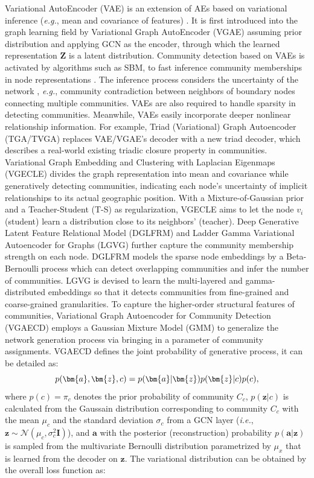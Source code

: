 \label{sec-model-vae}
Variational AutoEncoder (VAE) is an extension of AEs based on variational inference (\textit{e.g.}, mean and covariance of features) . It is first introduced into the graph learning field by Variational Graph AutoEncoder (VGAE)  assuming prior distribution and applying GCN as the encoder, through which the learned representation $\bm{Z}$ is a latent distribution. Community detection based on VAEs is activated by algorithms such as SBM, to fast inference community memberships in node representations . The inference process considers the uncertainty of the network , \textit{e.g.}, community contradiction between neighbors of boundary nodes connecting multiple communities. VAEs are also required to handle sparsity in detecting communities. Meanwhile, VAEs easily incorporate deeper nonlinear relationship information. For example, Triad (Variational) Graph Autoencoder (TGA/TVGA)  replaces VAE/VGAE's decoder with a new triad decoder, which describes a real-world existing triadic closure property in communities.
Variational Graph Embedding and Clustering with Laplacian Eigenmaps (VGECLE)  divides the graph representation into mean and covariance while generatively detecting communities, indicating each node's uncertainty of implicit relationships to its actual geographic position. With a Mixture-of-Gaussian prior and a Teacher-Student (T-S) as regularization, VGECLE aims to let the node $v_i$ (student) learn a distribution close to its neighbors' (teacher).
Deep Generative Latent Feature Relational Model (DGLFRM)  and Ladder Gamma Variational Autoencoder for Graphs (LGVG)  further capture the community membership strength on each node. DGLFRM models the sparse node embeddings by a Beta-Bernoulli process which can detect overlapping communities and infer the number of communities. LGVG is devised to learn the multi-layered and gamma-distributed embeddings so that it detects communities from fine-grained and coarse-grained granularities.
To capture the higher-order structural features of communities, Variational Graph Autoencoder for Community Detection (VGAECD)  employs a Gaussian Mixture Model (GMM) to generalize the network generation process via bringing in a parameter of community assignments. VGAECD defines the joint probability of generative process, it can be detailed as: \begin{equation}
\small
p(\bm{a}, \bm{z}, c) = p(\bm{a} |\bm{z}) p(\bm{z} |c) p(c),
\end{equation} 
where $p(c) = \pi_{c}$ denotes the prior probability of community $C_c$, $p(\bm{z} |c)$ is calculated from the Gaussain distribution corresponding to community $C_c$ with the mean $\mu_c$ and the standard deviation ${\sigma}_c$ from a GCN layer (\textit{i.e.}, $\bm{z} \sim \mathcal{N}(\mu_c, {\sigma}_c^2 \bm{I})$), and $\bm{a}$ with the posterior (reconstruction) probability $p(\bm{a} |\bm{z})$ is sampled from the multivariate Bernoulli distribution parametrized by $\mu_x$ that is learned from the decoder on $\bm{z}$. The variational distribution can be obtained by the overall loss function as: 
